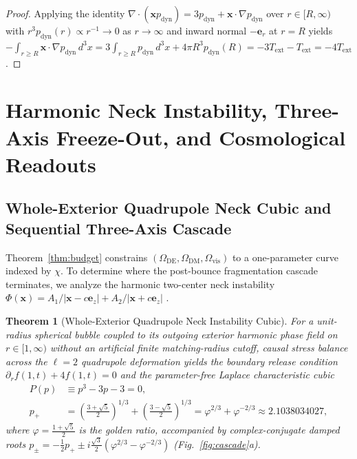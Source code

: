 \documentclass[pdflatex,sn-mathphys-num]{sn-jnl}
\theoremstyle{thmstyleone}
\newtheorem{theorem}{Theorem}
\theoremstyle{thmstyletwo}
\theoremstyle{thmstylethree}
\begin{document}
\begin{proof}
Applying the identity $\nabla\cdot(\mathbf{x}p_{\mathrm{dyn}}) = 3p_{\mathrm{dyn}} + \mathbf{x}\cdot\nabla p_{\mathrm{dyn}}$ over $r \in [R,\infty)$ with $r^3 p_{\mathrm{dyn}}(r) \propto r^{-1} \to 0$ as $r\to\infty$ and inward normal $-\mathbf{e}_r$ at $r=R$ yields $-\int_{r\ge R}\mathbf{x}\cdot\nabla p_{\mathrm{dyn}}\,d^3x = 3\int_{r\ge R}p_{\mathrm{dyn}}\,d^3x + 4\pi R^3 p_{\mathrm{dyn}}(R) = -3T_{\mathrm{ext}} - T_{\mathrm{ext}} = -4T_{\mathrm{ext}}$.
\end{proof}

\section{Harmonic Neck Instability, Three-Axis Freeze-Out, and Cosmological Readouts}\label{sec:cascade}

\subsection{Whole-Exterior Quadrupole Neck Cubic and Sequential Three-Axis Cascade}\label{subsec:neck}

Theorem~\ref{thm:budget} constrains $(\Omega_{\mathrm{DE}}, \Omega_{\mathrm{DM}}, \Omega_{\mathrm{vis}})$ to a one-parameter curve indexed by $\chi$. To determine where the post-bounce fragmentation cascade terminates, we analyze the harmonic two-center neck instability $\Phi(\mathbf{x}) = A_1/|\mathbf{x} - c\mathbf{e}_z| + A_2/|\mathbf{x} + c\mathbf{e}_z|$ \cite{Rayleigh1879,Ek2026Zenodo}.

\begin{theorem}[Whole-Exterior Quadrupole Neck Instability Cubic]\label{thm:neck}
For a unit-radius spherical bubble coupled to its outgoing exterior harmonic phase field on $r \in [1,\infty)$ without an artificial finite matching-radius cutoff, causal stress balance across the $\ell=2$ quadrupole deformation yields the boundary release condition $\partial_r f(1,t) + 4f(1,t) = 0$ and the parameter-free Laplace characteristic cubic
\begin{align}
P(p) &\equiv p^3 - 3p - 3 = 0, \nonumber\\
p_+ &= \left(\frac{3+\sqrt{5}}{2}\right)^{1/3} + \left(\frac{3-\sqrt{5}}{2}\right)^{1/3} = \varphi^{2/3} + \varphi^{-2/3} \approx 2.1038034027, \label{eq:neck_cubic}
\end{align}
where $\varphi = \frac{1+\sqrt{5}}{2}$ is the golden ratio, accompanied by complex-conjugate damped roots $p_\pm = -\frac{1}{2}p_+ \pm i\frac{\sqrt{3}}{2}(\varphi^{2/3} - \varphi^{-2/3})$ (Fig.~\ref{fig:cascade}a).
\end{theorem}
\end{document}

